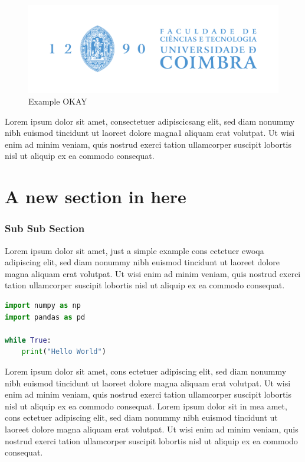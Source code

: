 \begin{figure}[H]
    \centering
    \includegraphics[width=0.5\linewidth]{images/UC_logos/FCTUC_V_FundoClaro.png}
    \caption{Example OKAY \cite{ExampleArticle}}
    \label{fig: sample image}
\end{figure}

Lorem ipsum dolor sit amet, consectetuer adipiscicsang elit, sed diam nonummy nibh euismod tincidunt ut laoreet dolore magna1 aliquam erat volutpat. Ut wisi enim ad minim veniam, quis nostrud exerci tation ullamcorper suscipit lobortis nisl ut aliquip ex ea commodo consequat.

\section{A new section in here}

\subsubsection{Sub Sub Section}

Lorem ipsum dolor sit amet, just a simple example cons ectetuer ewoqa adipiscing elit, sed diam nonummy nibh euismod tincidunt ut laoreet dolore magna aliquam erat volutpat. Ut wisi enim ad minim veniam, quis nostrud exerci tation ullamcorper suscipit lobortis nisl ut aliquip ex ea commodo consequat.


\begin{lstlisting}[language=Python, caption= Sample code listing, label=lst: sample code,frame=tb]
import numpy as np 
import pandas as pd

while True:
    print("Hello World")
\end{lstlisting}

Lorem ipsum dolor sit amet, cons ectetuer adipiscing elit, sed diam nonummy nibh euismod tincidunt ut laoreet dolore magna aliquam erat volutpat. Ut wisi enim ad minim veniam, quis nostrud exerci tation ullamcorper suscipit lobortis nisl ut aliquip ex ea commodo consequat.
Lorem ipsum dolor sit in mea amet, cons ectetuer adipiscing elit, sed diam nonummy nibh euismod tincidunt ut laoreet dolore magna aliquam erat volutpat. Ut wisi enim ad minim veniam, quis nostrud exerci tation ullamcorper suscipit lobortis nisl ut aliquip ex ea commodo consequat.